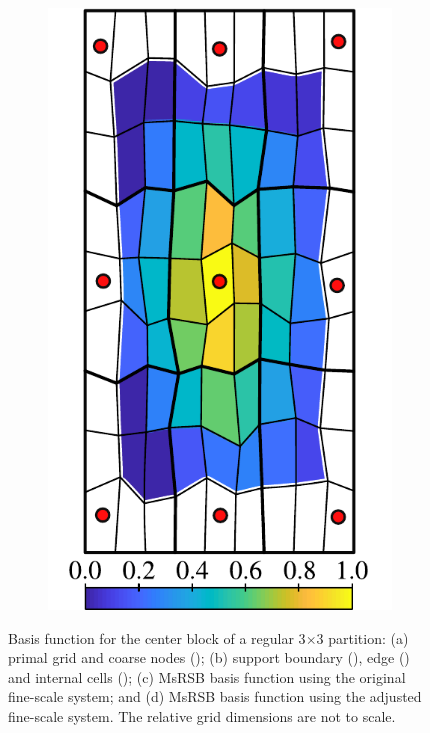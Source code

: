 \begin{figure} [htbp]
\begin{subfigure}[t]{0.22\textwidth}
  \centerline{\includegraphics[width=\linewidth]{figs/MPFA_9x9_d}}
  \caption{\label{fig:mpfa_demo_alter}}
\end{subfigure}
\caption[MsRSB basis functions for MPFA flow problem]{\label{fig:mpfa_demo} Basis function for the center block of a regular 3$\times$3 partition: (a) primal grid and coarse nodes (); (b) support boundary (), edge () and internal cells (); (c) MsRSB basis function using the original fine-scale system; and (d) MsRSB basis function using the adjusted fine-scale system. The relative grid dimensions are not to scale.}
\end{figure}

